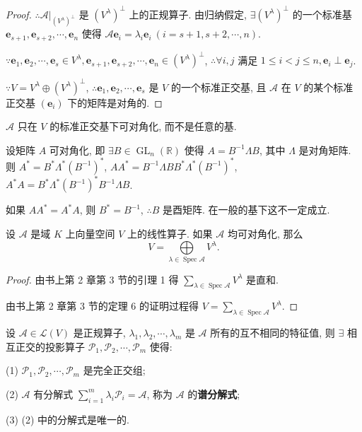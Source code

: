\documentclass{ctexart}
\begin{document}
\begin{proof}
    $\therefore\mathcal{A}|_{(V^\lambda)^\perp}$ 是 $(V^\lambda)^\perp$ 上的正规算子. 由归纳假定, $\exists(V^\lambda)^\perp$ 的一个标准基 $\boldsymbol{e}_{s+1},\boldsymbol{e}_{s+2},\cdots,\boldsymbol{e}_n$ 使得 $\mathcal{A}\boldsymbol{e}_i=\lambda_i\boldsymbol{e}_i\ (i=s+1,s+2,\cdots,n)$.

    $\because\boldsymbol{e}_1,\boldsymbol{e}_2,\cdots,\boldsymbol{e}_s\in V^\lambda,\boldsymbol{e}_{s+1},\boldsymbol{e}_{s+2},\cdots,\boldsymbol{e}_n\in(V^\lambda)^\perp$, $\therefore\forall i,j$ 满足 $1\leq i<j\leq n,\boldsymbol{e}_i\perp\boldsymbol{e}_j$.

    $\because V=V^\lambda\oplus(V^\lambda)^\perp$, $\therefore\boldsymbol{e}_1,\boldsymbol{e}_2,\cdots,\boldsymbol{e}_s$ 是 $V$ 的一个标准正交基, 且 $\mathcal{A}$ 在 $V$ 的某个标准正交基 $(\boldsymbol{e}_i)$ 下的矩阵是对角的.
\end{proof}
\begin{note}
    $\mathcal{A}$ 只在 $V$ 的标准正交基下可对角化, 而不是任意的基.

    设矩阵 $A$ 可对角化, 即 $\exists B\in\operatorname{GL}_n(\mathbb{R})$ 使得 $A=B^{-1}\Lambda B$, 其中 $\Lambda$ 是对角矩阵. 则 $A^*=B^*\Lambda^*(B^{-1})^*$, $AA^*=B^{-1}\Lambda BB^*\Lambda^*(B^{-1})^*$, $A^*A=B^*\Lambda^*(B^{-1})^*B^{-1}\Lambda B$.

    如果 $AA^*=A^*A$, 则 $B^*=B^{-1}$, $\therefore B$ 是酉矩阵. 在一般的基下这不一定成立.
\end{note}
\begin{lemma}\label{l3.4}
    设 $\mathcal{A}$ 是域 $K$ 上向量空间 $V$ 上的线性算子. 如果 $\mathcal{A}$ 均可对角化, 那么
    \[V=\bigoplus\limits_{\lambda\in\operatorname{Spec}\mathcal{A}}V^\lambda.\]
\end{lemma}
\begin{proof}
    由书上第 2 章第 3 节的引理 1 得 $\sum\limits_{\lambda\in\operatorname{Spec}\mathcal{A}}V^\lambda$ 是直和.

    由书上第 2 章第 3 节的定理 6 的证明过程得 $V=\sum\limits_{\lambda\in\operatorname{Spec}\mathcal{A}}V^\lambda$.
\end{proof}
\begin{theorem}\label{t3.8}
    设 $\mathcal{A}\in\mathcal{L}(V)$ 是正规算子, $\lambda_1,\lambda_2,\cdots,\lambda_m$ 是 $\mathcal{A}$ 所有的互不相同的特征值, 则 $\exists$ 相互正交的投影算子 $\mathcal{P}_1,\mathcal{P}_2,\cdots,\mathcal{P}_m$ 使得:

    (1) $\mathcal{P}_1,\mathcal{P}_2,\cdots,\mathcal{P}_m$ 是完全正交组;

    (2) $\mathcal{A}$ 有分解式 $\sum\limits_{i=1}^m\lambda_i\mathcal{P}_i=\mathcal{A}$, 称为 $\mathcal{A}$ 的\textbf{谱分解式};

    (3) (2) 中的分解式是唯一的.
\end{theorem}
\end{document}

